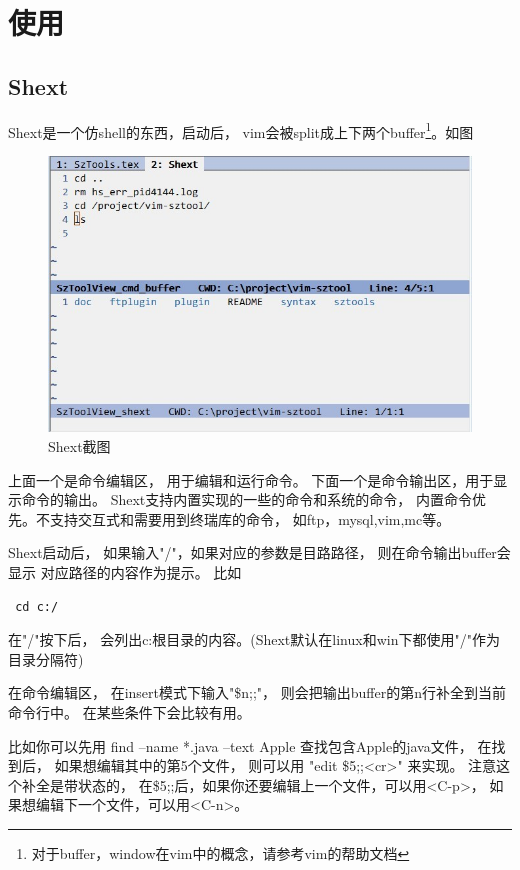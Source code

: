 \documentclass[oneside,openany]{book}
\begin{document}
\chapter{使用}
  \section{Shext}
  Shext是一个仿shell的东西，启动后， vim会被split成上下两个buffer\footnote{对于buffer，window在vim中的概念，请参考vim的帮助文档}。如图
  \begin{figure}[htbp]%
  \centering
  \includegraphics[scale=0.5]{shext.jpg}
  \caption{Shext截图}
  \end{figure}
  

  上面一个是命令编辑区， 用于编辑和运行命令。 下面一个是命令输出区，用于显示命令的输出。
Shext支持内置实现的一些的命令和系统的命令， 内置命令优先。不支持交互式和需要用到终瑞库的命令， 如ftp，mysql,vim,mc等。 

  Shext启动后， 如果输入"/"，如果对应的参数是目路路径， 则在命令输出buffer会显示
对应路径的内容作为提示。 比如 
  \begin{verbatim} cd c:/ \end{verbatim}
 在"/"按下后， 会列出c:根目录的内容。(Shext默认在linux和win下都使用"/"作为目录分隔符)

  在命令编辑区， 在insert模式下输入"\$n;;"， 则会把输出buffer的第n行补全到当前命令行中。
在某些条件下会比较有用。

  比如你可以先用 find --name *.java --text Apple 查找包含Apple的java文件， 在找到后，
如果想编辑其中的第5个文件， 则可以用 "edit \$5;;<cr>" 来实现。 注意这个补全是带状态的，
在\$5;;后，如果你还要编辑上一个文件，可以用<C-p>， 如果想编辑下一个文件，可以用<C-n>。
\end{document}
